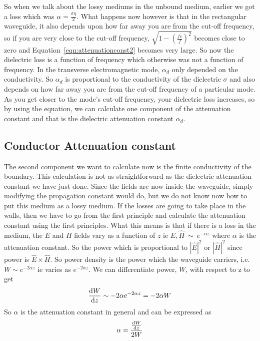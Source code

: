 So when we talk about the lossy mediums in the unbound medium, earlier we got a loss which was $\alpha = \frac{\sigma\eta}{2}$. What happens now however is that in the rectangular waveguide, it also depends upon how far away you are from the cut-off frequency, so if you are very close to the cut-off frequency, $\sqrt{1 - \left(\frac{fc}{f}\right)^{2}}$ becomes close to zero and Equation~\eqref{eqn:attenuationconst2} becomes very large. So now the dielectric loss is a function of frequency which otherwise was not a function of frequency. In the transverse electromagnetic mode,  $\alpha_{d}$ only depended on the conductivity. So $\alpha_{d}$ is proportional to the conductivity of the dielectric $\sigma$ and also depends on how far away you are from the cut-off frequency of a particular mode. As you get closer to the mode's cut-off frequency, your dielectric loss increases, so by using the equation, we can calculate one component of the attenuation constant and that is the dielectric attenuation constant $\alpha_{d}$.

\subsection{Conductor Attenuation constant}
The second component we want to calculate now is the finite conductivity of the boundary. This calculation is not as straightforward as the dielectric attenuation constant we have just done. Since the fields are now inside the waveguide, simply modifying the propagation constant would do, but we do not know now how to put this medium as a lossy medium. If the losses are going to take place in the walls, then we have to go from the first principle and calculate the attenuation constant using the first principles. What this means is that if there is a loss in the medium, the $E$ and $H$ fields vary as a function of $z$ ie $ {\hat{E}}, {\hat{H}} \ \sim\ e^{-\alpha z}$ where $\alpha$ is the attenuation constant. So the power which is proportional to $|{\hat{E}}|^{2}$ or $|{\hat{H}}|^{2}$ since power is ${\hat{E}}\times{\hat{H}}$. So power density is the power which the waveguide carriers, i.e. $W\sim e^{-2\alpha z}$ ie varies as $e^{-2\alpha z}$. We can differentiate power, $W$, with respect to z to get 
\begin{dmath*}
\dv{W}{z}\sim-2\alpha e^{-2\alpha z} = -2\alpha W 
\end{dmath*}
So $\alpha$ is the attenuation constant in general and can be expressed as
\begin{equation*}
\alpha = \frac{\dv{W}{z}}{2W}
\label{eqn:calcalpha}
\end{equation*}

